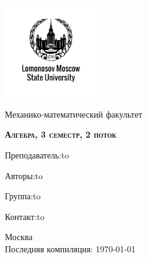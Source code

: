 \begin{titlepage}
  \newpage
  \begin{center}
  \includegraphics[width=4cm]{image/image.png}
  \end{center}
  \vspace{4em}
  
  \begin{center}
  \Large Механико-математический факультет  
  \end{center}
  \vspace{2em}
  
  \begin{center}
  \large{\textsc{\textbf{Алгебра, 3 семестр, 2 поток}}}
  \end{center}
  \vspace{6em}
  
  \newbox{\lbox}
  \newlength{\maxl}
  \setlength{\maxl}{\wd\lbox}
  \hfill\parbox{9cm}
  {
  Преподаватель:\hfill\hbox to\vspace{0.5cm}
  
  Авторы:\hfill\hbox to\vspace{0.15cm}

  Группа:\hfill\hbox to\vspace{0.5cm}
  
  Контакт:\hfill\hbox to\vspace{0.5cm}
  }

  \vspace{\fill}
  \begin{center}
  Москва \\Последняя компиляция: \today
  \end{center}
  
\end{titlepage}